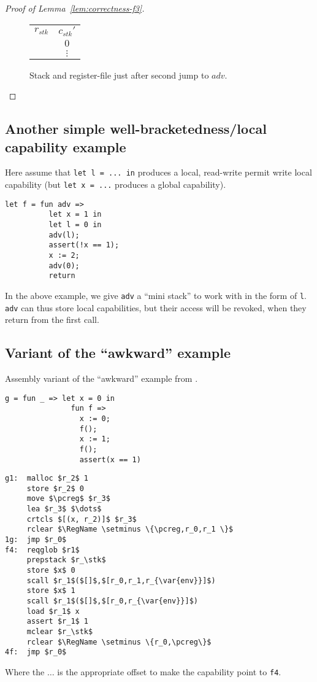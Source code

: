\documentclass[a4paper]{article}
\newcommand{\var}[1]{\mathit{#1}}
\newcommand{\pcreg}{\mathrm{pc}}
\newcommand{\adv}{\var{adv}}
\newcommand{\stk}{\var{stk}}
\newcommand{\plaindom}[1]{\mathrm{#1}}
\newcommand{\RegName}{\plaindom{RegisterName}}
\begin{document}
\begin{proof}[Proof of Lemma~\ref{lem:correctness-f3}]
\begin{enumproof}[start=3]
\begin{enumproof}[start=3]
\begin{figure}
\begin{tabular}{r |c |}
          \cline{2-2}
          $r_{\var{stk}}$  & $c_{\var{stk}}'$ \\
          \cline{2-2}
                   & $0$ \\
          \cline{2-2}
                   & $\vdots$ \\
          \cline{2-2}
        \end{tabular}
        \caption{Stack and register-file just after second jump to $\adv$.}
        \label{fig:f3-stack-before-snd-adv}
      \end{figure}
    \end{enumproof}
  \end{enumproof}
\end{proof}

\subsection{Another simple well-bracketedness/local capability example}
Here assume that \texttt{let l = ... in} produces a local, read-write permit write local capability (but \texttt{let x = ...} produces a global capability). 
\begin{verbatim}
let f = fun adv =>
          let x = 1 in
          let l = 0 in
          adv(l);
          assert(!x == 1);
          x := 2;
          adv(0);
          return
\end{verbatim}
In the above example, we give \texttt{adv} a ``mini stack'' to work with in the form of \texttt{l}. \texttt{adv} can thus store local capabilities, but their access will be revoked, when they return from the first call.

\subsection{Variant of the ``awkward'' example}
Assembly variant of the ``awkward'' example from \citep[p.~11]{Dreyer:2010:IHS:1863543.1863566}. 
\begin{verbatim}
g = fun _ => let x = 0 in
               fun f =>
                 x := 0;
                 f();
                 x := 1;
                 f();
                 assert(x == 1)
\end{verbatim}
\begin{lstlisting}
g1:  malloc $r_2$ 1
     store $r_2$ 0
     move $\pcreg$ $r_3$
     lea $r_3$ $\dots$
     crtcls $[(x, r_2)]$ $r_3$
     rclear $\RegName \setminus \{\pcreg,r_0,r_1 \}$
1g:  jmp $r_0$
f4:  reqglob $r1$
     prepstack $r_\stk$
     store $x$ 0
     scall $r_1$($[]$,$[r_0,r_1,r_{\var{env}}]$)
     store $x$ 1
     scall $r_1$($[]$,$[r_0,r_{\var{env}}]$)
     load $r_1$ x
     assert $r_1$ 1
     mclear $r_\stk$
     rclear $\RegName \setminus \{r_0,\pcreg\}$
4f:  jmp $r_0$
\end{lstlisting}
Where the $\dots$ is the appropriate offset to make the capability point to \texttt{f4}.
\end{document}
